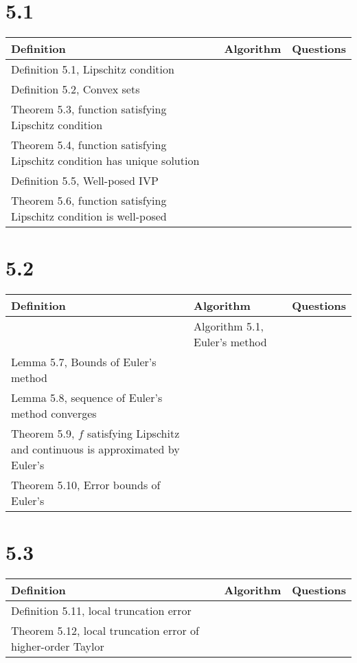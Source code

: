 \documentclass{article}
\begin{document}
\section*{5.1}

\begin{tabularx}{\textwidth}{ |X|c|c| }
    \hline
	{\bf Definition} & {\bf Algorithm} & {\bf Questions} \\
    \hline
	Definition 5.1, Lipschitz condition & & \\
    \hline
	Definition 5.2, Convex sets & & \\
    \hline
	Theorem 5.3, function satisfying Lipschitz condition & & \\
    \hline
	Theorem 5.4, function satisfying Lipschitz condition has unique solution & & \\
    \hline
	Definition 5.5, Well-posed IVP & & \\
    \hline
	Theorem 5.6, function satisfying Lipschitz condition is well-posed & & \\
    \hline
\end{tabularx}

\section*{5.2}

\begin{tabularx}{\textwidth}{ |X|X|c| }
    \hline
	{\bf Definition} & {\bf Algorithm} & {\bf Questions} \\
    \hline
	 &  Algorithm 5.1, Euler's method & \\
    \hline
	Lemma 5.7, Bounds of Euler's method & & \\
    \hline
	Lemma 5.8, sequence of Euler's method converges & & \\
    \hline
	Theorem 5.9, $f$ satisfying Lipschitz and continuous is approximated by Euler's & & \\
    \hline
	Theorem 5.10, Error bounds of Euler's & & \\
    \hline
\end{tabularx}

\section*{5.3}

\begin{tabularx}{\textwidth}{ |X|c|c| }
    \hline
	{\bf Definition} & {\bf Algorithm} & {\bf Questions} \\
    \hline
	Definition 5.11, local truncation error & & \\
    \hline
	Theorem 5.12, local truncation error of higher-order Taylor & & \\
    \hline
\end{tabularx}
\end{document}
